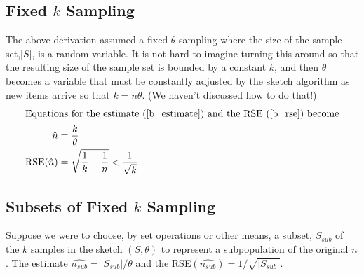 %
\subsection{Fixed \texorpdfstring{$k$}{k} Sampling}
The above derivation assumed a fixed $\theta$ sampling where the size of the sample set,$|S|$, is a random variable.
It is not hard to imagine turning this around so that the resulting size of the sample set is bounded by a constant $k$, and 
then $\theta$ becomes a variable that must be constantly adjusted by the sketch algorithm as new items arrive so that $k = n\theta$.
(We haven't discussed how to do that!)
%
\begin{align}
\shortintertext{Equations for the estimate (\ref{b_estimate}) and the RSE (\ref{b_rse}) become}
\hat{n}             &= \frac{k}{\theta} \\
\text{RSE}(\hat{n}) &= \sqrt{\frac{1}{k} - \frac{1}{n}} < \frac{1}{\sqrt{k}} \label{k_rse}
\end{align}
%
\subsection{Subsets of Fixed \texorpdfstring{$k$}{k} Sampling}
Suppose we were to choose, by set operations or other means, a subset, $S_{sub}$ of the $k$ samples in the sketch $(S, \theta)$ to represent a subpopulation of the original $n$. The estimate $\widehat{n_{sub}} = |S_{sub}|/\theta$ and the RSE$(\widehat{n_{sub}}) = 1/\sqrt{|S_{sub}|}$. 
%